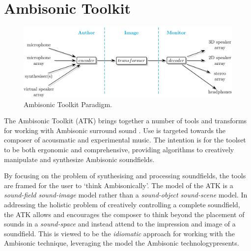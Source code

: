 \documentclass{article}
\begin{document}
\section{Ambisonic Toolkit}\label{sec:atk}

\begin{figure}[t]
\captionsetup{aboveskip=-6pt}
\centering
\includegraphics[width=1.5\columnwidth]{figures/atk-network.png}
\setlength{\abovecaptionskip}{0pt plus 3pt minus 2pt} %
\caption{Ambisonic Toolkit Paradigm.\label{fig:atkParadigm}}
\end{figure}

The Ambisonic Toolkit (ATK) brings together a number of tools and transforms for working with Ambisonic surround sound  \cite{Anderson:2009introducingATK}.
Use is targeted towards the composer of acousmatic and experimental music. The intention is for the toolset to be both ergonomic and comprehensive, providing algorithms to creatively manipulate and synthesize Ambisonic soundfields.

By focusing on the problem of synthesising and processing soundfields, the tools are framed for the user to `think Ambisonic\-ally'. The model of the ATK is a \emph{sound-field sound-image} model ra\-ther than a \emph{sound-object sound-scene} model.
In addressing the holistic problem of creatively controlling a complete soundfield, the ATK allows and encourages the composer to think beyond the placement of sounds in a \emph{sound-space} and instead attend to the impression and image of a soundfield.
This is viewed to be the \emph{idiomatic} approach for working with the Ambisonic technique, leveraging the model the Ambisonic technology\linebreak presents.


\end{document}
